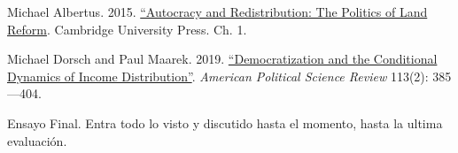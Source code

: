 \documentclass[letterpaper]{article}
\renewenvironment{itemize}{
  \begin{list}{}{
    \setlength{\leftmargin}{1.5em}
  }
}{
  \end{list}
}
\begin{document}
\begin{enumerate}[label=\roman*.]
\begin{itemize}
\begin{itemize}
          \item[$\circ$] Michael Albertus. 2015. \href{https://github.com/hbahamonde/Ciencia_Politica_II/raw/master/Readings/Albertus_2015.pdf}{``Autocracy and Redistribution: The Politics of Land Reform}. Cambridge University Press. Ch. 1.
					
          \item[$\circ$] Michael Dorsch and Paul Maarek. 2019. \href{https://github.com/hbahamonde/Ciencia_Politica_II/raw/master/Readings/Dorsch_2019.pdf}{``Democratization and the Conditional Dynamics of Income Distribution''}. \emph{American Political Science Review} 113(2): 385---404.
				\end{itemize}


		\end{itemize}

\item[{\color{red}\Pointinghand}] Ensayo Final. Entra todo lo visto y discutido hasta el momento, hasta la ultima evaluaci\'on.

\end{enumerate}


	


















\newpage
{}
\setcounter{page}{1}
\printbibliography
\end{document}
